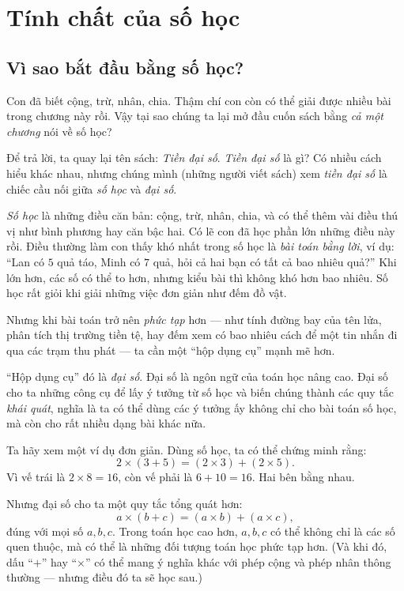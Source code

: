 \chapter{Tính chất của số học}
\section{Vì sao bắt đầu bằng số học?}

Con đã biết cộng, trừ, nhân, chia. Thậm chí con còn có thể giải
được nhiều bài trong chương này rồi. Vậy tại sao chúng ta lại mở
đầu cuốn sách bằng \emph{cả một chương} nói về số học?

Để trả lời, ta quay lại tên sách: \emph{Tiền đại số}. \emph{Tiền
đại số} là gì? Có nhiều cách hiểu khác nhau, nhưng chúng mình
(những người viết sách) xem \emph{tiền đại số} là chiếc cầu nối
giữa \emph{số học} và \emph{đại số}.

\emph{Số học} là những điều căn bản: cộng, trừ, nhân, chia, và có
thể thêm vài điều thú vị như bình phương hay căn bậc hai. Có lẽ
con đã học phần lớn những điều này rồi. Điều thường làm con thấy
khó nhất trong số học là \emph{bài toán bằng lời}, ví dụ: “Lan có
$5$ quả táo, Minh có $7$ quả, hỏi cả hai bạn có tất cả bao nhiêu
quả?” Khi lớn hơn, các số có thể to hơn, nhưng kiểu bài thì không
khó hơn bao nhiêu. Số học rất giỏi khi giải những việc đơn giản
như đếm đồ vật. 

Nhưng khi bài toán trở nên \emph{phức tạp} hơn — như tính đường
bay của tên lửa, phân tích thị trường tiền tệ, hay đếm xem có bao
nhiêu cách để một tin nhắn đi qua các trạm thu phát — ta cần một
“hộp dụng cụ” mạnh mẽ hơn.

“Hộp dụng cụ” đó là \emph{đại số}. Đại số là ngôn ngữ của toán
học nâng cao. Đại số cho ta những công cụ để lấy ý tưởng từ số học
và biến chúng thành các quy tắc \emph{khái quát}, nghĩa là ta có
thể dùng các ý tưởng ấy không chỉ cho bài toán số học, mà còn cho
rất nhiều dạng bài khác nữa.

Ta hãy xem một ví dụ đơn giản. Dùng số học, ta có thể chứng minh rằng:
\[
2\times(3+5)=(2\times3)+(2\times5).
\]
Vì vế trái là $2\times8=16$, còn vế phải là $6+10=16$. Hai bên bằng nhau.

Nhưng đại số cho ta một quy tắc tổng quát hơn:
\[
a\times(b+c)=(a\times b)+(a\times c),
\]
đúng với mọi số $a,b,c$. Trong toán học cao hơn, $a,b,c$ có thể không
chỉ là các số quen thuộc, mà có thể là những đối tượng toán học phức
tạp hơn. (Và khi đó, dấu “$+$” hay “$\times$” có thể mang ý nghĩa khác
với phép cộng và phép nhân thông thường — nhưng điều đó ta sẽ học sau.)

